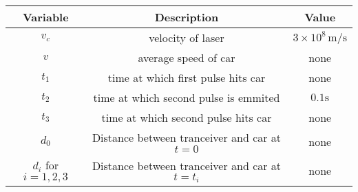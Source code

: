 \begin{tabular}{|c|c|c|}
    \hline
    \textbf{Variable} & \textbf{Description} & \textbf{Value} \\
    \hline
    $v_c$ & velocity of laser & $3 \times 10^{8} \, \text{m/s}$ \\
    \hline
    $v$ & average speed of car & none \\
    \hline
    $t_1$ & time at which first pulse hits car & none \\
    \hline
     $t_2$ & time at which second pulse is emmited & $0.1\text{s}$ \\
    \hline
     $t_3$ & time at which  second pulse hits car & none \\
    \hline
    $d_0$  & Distance between tranceiver and car at $t=0$ & none \\
    \hline
    $d_i$ for $i=1,2,3$ & Distance between tranceiver and car at $t=t_i$ & none \\
    \hline
  \end{tabular}

